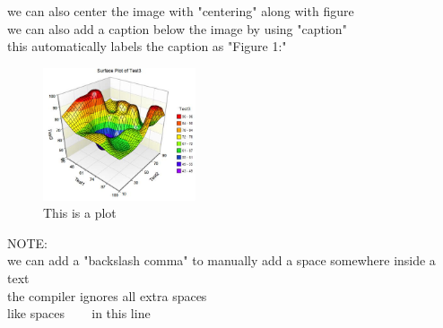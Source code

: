 \documentclass[10pt, a4paper]{article}
\begin{document}
we can also center the image with "centering" along with figure\\
we can also add a caption below the image by using "caption"\\
this automatically labels the caption as "Figure 1:"
\begin{figure}[h]
\centering
\includegraphics[width=0.4\textwidth]{plot1}
\caption{This is a plot}
\end{figure}



NOTE:\\
we can add a "backslash comma" to manually add a space somewhere inside a text\\
the compiler ignores all         extra spaces\\
like spaces \,\,\,\,\,\,\,\,\, in this line\\
\end{document}
